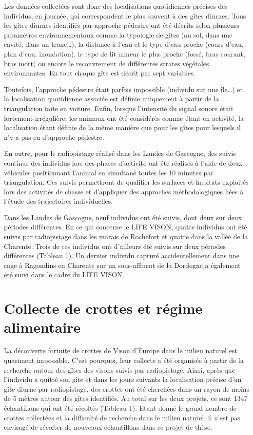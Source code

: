\documentclass[
  letterpaper,
  DIV=11,
  numbers=noendperiod]{scrreprt}
\begin{document}
Les données collectées sont donc des localisations quotidiennes précises
des individus, en journée, qui correspondent le plus souvent à des gîtes
diurnes. Tous les gîtes diurnes identifiés par approche pédestre ont été
décrits selon plusieurs paramètres environnementaux comme la typologie
de gîtes (au sol, dans une cavité, dans un tronc\ldots), la distance à
l'eau et le type d'eau proche (cours d'eau, plan d'eau, inondation), le
type de lit mineur le plus proche (fossé, bras courant, bras mort) ou
encore le recouvrement de différentes strates végétales environnantes.
En tout chaque gîte est décrit par sept variables.

Toutefois, l'approche pédestre était parfois impossible (individu sur
une île\ldots) et la localisation quotidienne associée est définie
uniquement à partir de la triangulation faite en voiture. Enfin, lorsque
l'intensité du signal sonore était fortement irrégulière, les animaux
ont été considérés comme étant en activité, la localisation étant
définie de la même manière que pour les gîtes pour lesquels il n'y a pas
eu d'approche pédestre.

En outre, pour le radiopistage réalisé dans les Landes de Gascogne, des
suivis continus des individus lors des phases d'activité ont été
réalisés à l'aide de deux véhicules positionnant l'animal en simultané
toutes les 10 minutes par triangulation. Ces suivis permettront de
qualifier les surfaces et habitats exploités lors des activités de
chasse et d'appliquer des approches méthodologiques liées à l'étude des
trajectoires individuelles.

Dans les Landes de Gascogne, neuf individus ont été suivis, dont deux
sur deux périodes différentes. En ce qui concerne le LIFE VISON, quatre
individus ont été suivis par radiopistage dans les marais de Rochefort
et quatre dans la vallée de la Charente. Trois de ces individus ont
d'ailleurs été suivis sur deux périodes différentes (Tableau 1). Un
dernier individu capturé accidentellement dans une cage à Ragondins en
Charente sur un sous-affluent de la Dordogne a également été suivi dans
le cadre du LIFE VISON.

\section{Collecte de crottes et régime
alimentaire}\label{collecte-de-crottes-et-ruxe9gime-alimentaire}

La découverte fortuite de crottes de Vison d'Europe dans le milieu
naturel est quasiment impossible. C'est pourquoi, leur collecte a été
organisée à partir de la recherche autour des gîtes des visons suivis
par radiopistage. Ainsi, après que l'individu a quitté son gîte et dans
les jours suivants la localisation précise d'un gîte diurne par
radiopistage, des crottes ont été cherchées dans un rayon de moins de 5
mètres autour des gîtes identifiés. Au total sur les deux projets, ce
sont 1347 échantillons qui ont été récoltés (Tableau 1). Etant donné le
grand nombre de crottes collectées et la difficulté de recherche dans le
milieu naturel, il n'est pas envisagé de récolter de nouveaux
échantillons dans ce projet de thèse.
\end{document}
